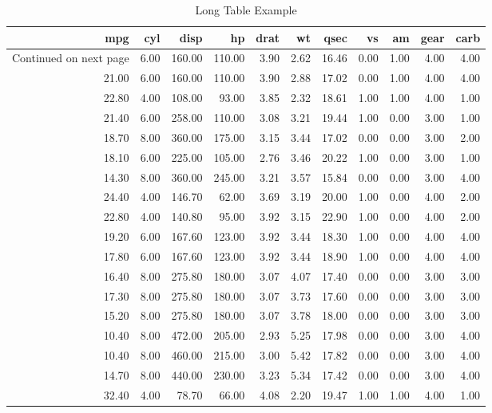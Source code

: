 \documentclass[12pt,preprint, authoryear]{elsarticle}
\numberwithin{equation}{section}
\numberwithin{figure}{section}
\numberwithin{table}{section}
\begin{document}
\begingroup\fontsize{12pt}{13pt}\selectfont
\begin{longtable}{rrrrrrrrrrr}
\caption{Long Table Example} \\ 
  \toprule
mpg & cyl & disp & hp & drat & wt & qsec & vs & am & gear & carb \\ 
  \hline 
\endhead 
\hline 
{\footnotesize Continued on next page} 
\endfoot 
\endlastfoot 
 \midrule
21.00 & 6.00 & 160.00 & 110.00 & 3.90 & 2.62 & 16.46 & 0.00 & 1.00 & 4.00 & 4.00 \\ 
  21.00 & 6.00 & 160.00 & 110.00 & 3.90 & 2.88 & 17.02 & 0.00 & 1.00 & 4.00 & 4.00 \\ 
  22.80 & 4.00 & 108.00 & 93.00 & 3.85 & 2.32 & 18.61 & 1.00 & 1.00 & 4.00 & 1.00 \\ 
  21.40 & 6.00 & 258.00 & 110.00 & 3.08 & 3.21 & 19.44 & 1.00 & 0.00 & 3.00 & 1.00 \\ 
  18.70 & 8.00 & 360.00 & 175.00 & 3.15 & 3.44 & 17.02 & 0.00 & 0.00 & 3.00 & 2.00 \\ 
  18.10 & 6.00 & 225.00 & 105.00 & 2.76 & 3.46 & 20.22 & 1.00 & 0.00 & 3.00 & 1.00 \\ 
  14.30 & 8.00 & 360.00 & 245.00 & 3.21 & 3.57 & 15.84 & 0.00 & 0.00 & 3.00 & 4.00 \\ 
  24.40 & 4.00 & 146.70 & 62.00 & 3.69 & 3.19 & 20.00 & 1.00 & 0.00 & 4.00 & 2.00 \\ 
  22.80 & 4.00 & 140.80 & 95.00 & 3.92 & 3.15 & 22.90 & 1.00 & 0.00 & 4.00 & 2.00 \\ 
  19.20 & 6.00 & 167.60 & 123.00 & 3.92 & 3.44 & 18.30 & 1.00 & 0.00 & 4.00 & 4.00 \\ 
  17.80 & 6.00 & 167.60 & 123.00 & 3.92 & 3.44 & 18.90 & 1.00 & 0.00 & 4.00 & 4.00 \\ 
  16.40 & 8.00 & 275.80 & 180.00 & 3.07 & 4.07 & 17.40 & 0.00 & 0.00 & 3.00 & 3.00 \\ 
  17.30 & 8.00 & 275.80 & 180.00 & 3.07 & 3.73 & 17.60 & 0.00 & 0.00 & 3.00 & 3.00 \\ 
  15.20 & 8.00 & 275.80 & 180.00 & 3.07 & 3.78 & 18.00 & 0.00 & 0.00 & 3.00 & 3.00 \\ 
  10.40 & 8.00 & 472.00 & 205.00 & 2.93 & 5.25 & 17.98 & 0.00 & 0.00 & 3.00 & 4.00 \\ 
  10.40 & 8.00 & 460.00 & 215.00 & 3.00 & 5.42 & 17.82 & 0.00 & 0.00 & 3.00 & 4.00 \\ 
  14.70 & 8.00 & 440.00 & 230.00 & 3.23 & 5.34 & 17.42 & 0.00 & 0.00 & 3.00 & 4.00 \\ 
  32.40 & 4.00 & 78.70 & 66.00 & 4.08 & 2.20 & 19.47 & 1.00 & 1.00 & 4.00 & 1.00 \\ 

\end{longtable}
\end{document}
